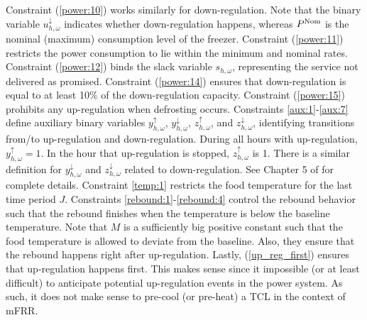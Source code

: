 \documentclass[11pt,a4paper]{article}
\begin{document}
%
Constraint (\ref{power:10}) works similarly for down-regulation. Note that the binary variable $u^{\downarrow}_{h,\omega}$ indicates whether down-regulation happens, whereas $P^{\rm{Nom}}$ is the nominal (maximum) consumption level of the freezer.
%
Constraint (\ref{power:11}) restricts the power consumption to lie within the minimum and nominal rates.
%
Constraint (\ref{power:12}) binds the slack variable $s_{h,\omega}$, representing the service not delivered as promised.
%
Constraint (\ref{power:14}) ensures that down-regulation is equal to at least 10\% of the down-regulation capacity.
%
Constraint (\ref{power:15}) prohibits any up-regulation when defrosting occurs.
%
Constraints \eqref{aux:1}-\eqref{aux:7} define auxiliary binary variables $y^{\uparrow}_{h,\omega}$, $y^{\downarrow}_{h,\omega}$, $z^{\uparrow}_{h,\omega}$, and $z^{\downarrow}_{h,\omega}$, identifying transitions from/to up-regulation and down-regulation.
During all hours with up-regulation, $y^{\uparrow}_{h,\omega}=1$. In the hour that up-regulation is stopped, $z^{\uparrow}_{h,\omega}$ is 1. There is a similar definition for $y^{\downarrow}_{h,\omega}$ and $z^{\downarrow}_{h,\omega}$ related to down-regulation.
See Chapter 5 of  \cite{morales2013integrating} for complete details.
%
Constraint \eqref{temp:1} restricts the food temperature for the last time period $J$.
%
Constraints \eqref{rebound:1}-\eqref{rebound:4} control the rebound behavior such that the rebound finishes when the temperature is below the baseline temperature. Note that $M$ is a sufficiently big positive constant such that the food temperature is allowed to deviate from the baseline. Also, they ensure that the rebound happens right after up-regulation.
%
Lastly, (\ref{up_reg_first}) ensures that up-regulation happens first. This makes sense since it impossible (or at least difficult) to anticipate potential up-regulation events in the power system. As such, it does not make sense to pre-cool (or pre-heat) a TCL in the context of mFRR.

%
\printbibliography


\end{document}
